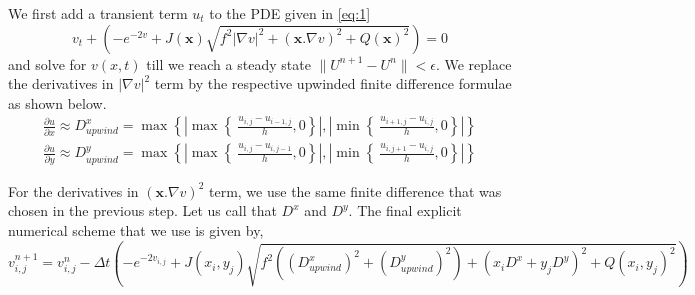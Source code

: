 \documentclass{article}[11pt]
\begin{document}
\noindent
We first add a transient term $u_t$ to the PDE given in \ref{eq:1} 
\begin{equation}
v_t + \left(-e^{-2v} + J(\mathbf{x})\sqrt{f^2\lvert \nabla v \rvert^2 +
	(\mathbf{x}.\nabla v)^2 + Q(\mathbf{x})^2} \right) = 0 \label{eq:2}
\end{equation}
and
solve for $v(x,t)$ till we reach a steady state $\lVert U^{n+1} - U^{n} \rVert < \epsilon$.  We replace the
derivatives in $\lvert \nabla v \rvert^2$ term by the respective upwinded finite
difference formulae as shown below.
\begin{eqnarray}
  \frac{\partial u}{\partial x} \approx D^{x}_{upwind} = \max\left\{\left\lvert
  \max\left\{\ \frac{u_{i,j}-u_{i-1,j}}{h},0\right\} \right\rvert, \left\lvert\min\left\{\ \frac{u_{i+1,j}-u_{i,j}}{h},0\right\} \right\rvert \right\}\\
  \frac{\partial u}{\partial y} \approx D^{y}_{upwind} = \max\left\{\left\lvert
  \max\left\{\ \frac{u_{i,j}-u_{i,j-1}}{h},0\right\} \right\rvert, \left\lvert\min\left\{\ \frac{u_{i,j+1}-u_{i,j}}{h},0\right\} \right\rvert \right\}
\end{eqnarray}

\noindent
For the derivatives in $(\mathbf{x}.\nabla v)^2$ term, we use the same finite difference that was chosen in the previous step. Let us call that $D^x$ and $D^y$. The final explicit numerical scheme that we use is given by,
\begin{equation}
	v_{i,j}^{n+1} = v_{i,j}^n - \Delta t \left(-e^{-2v_{i,j}} + J(x_i,y_j) \sqrt{f^2\left( (D^x_{upwind})^2 + (D^y_{upwind})^2 \right) + \left(x_iD^x + y_jD^y\right)^2 + Q(x_i,y_j)^2} \right)
\end{equation}

\noindent
\end{document}
